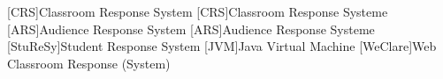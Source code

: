 \begin{acronym}[StuReSy]
    [CRS]{Classroom Response System}
    [CRS]{Classroom Response Systeme}
    [ARS]{Audience Response System}
    [ARS]{Audience Response Systeme}
    [StuReSy]{Student Response System}
    [JVM]{Java Virtual Machine}
    [WeClare]{Web Classroom Response (System)}
\end{acronym}
